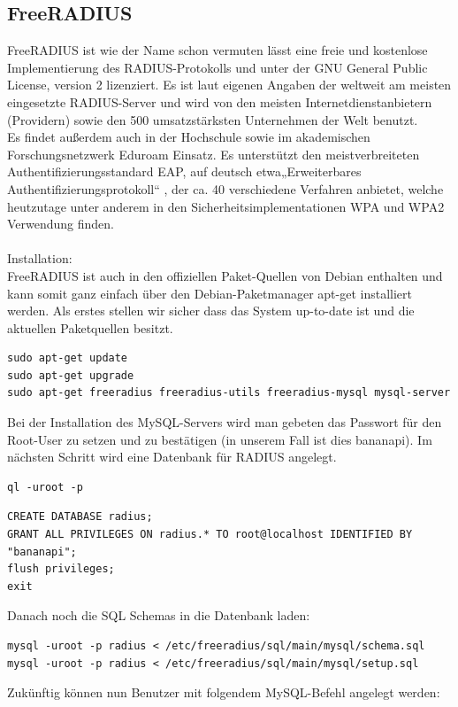 \subsection{FreeRADIUS}
FreeRADIUS ist wie der Name schon vermuten lässt eine freie und kostenlose Implementierung des
RADIUS-Protokolls und unter der GNU General Public License, version 2 lizenziert. Es ist laut
eigenen Angaben der weltweit am meisten eingesetzte RADIUS-Server und wird von den meisten
Internetdienstanbietern (Providern) sowie den 500 umsatzstärksten Unternehmen der Welt
benutzt. \cite{rad2}\\
Es findet außerdem auch in der Hochschule sowie im akademischen Forschungsnetzwerk Eduroam
Einsatz. Es unterstützt den meistverbreiteten Authentifizierungsstandard EAP, auf deutsch etwa„Erweiterbares Authentifizierungsprotokoll“ \cite{rad3}
, der ca. 40 verschiedene Verfahren anbietet, welche
heutzutage unter anderem in den Sicherheitsimplementationen WPA und WPA2 Verwendung
finden.\\
~\\
Installation:\\
FreeRADIUS ist auch in den offiziellen Paket-Quellen von Debian enthalten und kann somit ganz
einfach über den Debian-Paketmanager apt-get installiert werden. Als erstes stellen wir sicher dass
das System up-to-date ist und die aktuellen Paketquellen besitzt. \cite{rad4}
\begin{lstlisting}
sudo apt-get update
sudo apt-get upgrade
sudo apt-get freeradius freeradius-utils freeradius-mysql mysql-server
\end{lstlisting}
Bei der Installation des MySQL-Servers wird man gebeten das Passwort für den Root-User zu
setzen und zu bestätigen (in unserem Fall ist dies bananapi). Im nächsten Schritt wird eine
Datenbank für RADIUS angelegt.
\begin{lstlisting}
ql -uroot -p
\end{lstlisting}
\begin{lstlisting}
CREATE DATABASE radius;
GRANT ALL PRIVILEGES ON radius.* TO root@localhost IDENTIFIED BY "bananapi";
flush privileges;
exit
\end{lstlisting}
Danach noch die SQL Schemas in die Datenbank laden: \cite{rad5}
\begin{lstlisting}
mysql -uroot -p radius < /etc/freeradius/sql/main/mysql/schema.sql
mysql -uroot -p radius < /etc/freeradius/sql/main/mysql/setup.sql
\end{lstlisting}
Zukünftig können nun Benutzer mit folgendem MySQL-Befehl angelegt werden:
